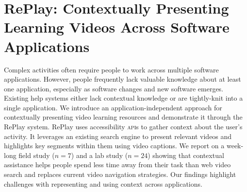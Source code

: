 \chapter{RePlay: Contextually Presenting Learning Videos Across Software Applications}
Complex activities often require people to work across multiple software applications. However, people frequently lack valuable knowledge about at least one application, especially as software changes and new software emerges. Existing help systems either lack contextual knowledge or are tightly-knit into a single application. We introduce an application-independent approach for contextually presenting video learning resources and demonstrate it through the RePlay system. RePlay uses accessibility \textsc{api}s to gather context about the user's activity. It leverages an existing search engine to present relevant videos and highlights key segments within them using video captions. We report on a week-long field study ($n\!=\!7$) and a lab study ($n\!=\!24$) showing that contextual assistance helps people spend less time away from their task than web video search and replaces current video navigation strategies. Our findings highlight challenges with representing and using context across applications.

